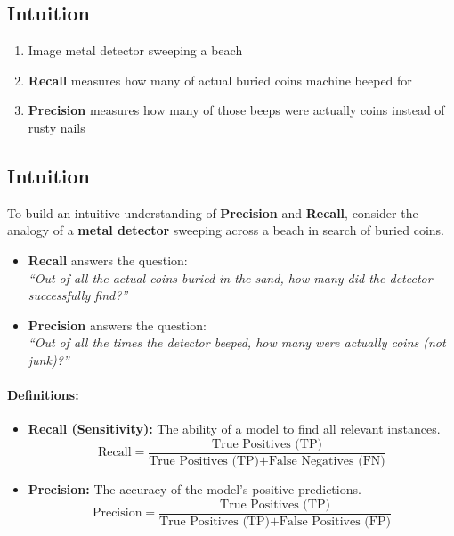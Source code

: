 \documentclass[12pt]{article}
\begin{document}
\subsection{Intuition}
\begin{enumerate}
    \item Image metal detector sweeping a beach
    \item \textbf{Recall} measures how many of actual buried coins machine beeped for
    \item \textbf{Precision} measures how many of those beeps were actually coins instead of rusty nails
\end{enumerate}

\subsection{Intuition}

To build an intuitive understanding of \textbf{Precision} and \textbf{Recall}, consider the analogy of a \textbf{metal detector} sweeping across a beach in search of buried coins.

\begin{itemize}
    \item \textbf{Recall} answers the question: \\
          \textit{``Out of all the actual coins buried in the sand, how many did the detector successfully find?''}
    \item \textbf{Precision} answers the question: \\
          \textit{``Out of all the times the detector beeped, how many were actually coins (not junk)?''}
\end{itemize}

\paragraph{Definitions:}

\begin{itemize}
    \item \textbf{Recall (Sensitivity):} The ability of a model to find all relevant instances.
          \[
              \text{Recall} = \frac{\text{True Positives (TP)}}{\text{True Positives (TP)} + \text{False Negatives (FN)}}
          \]
    \item \textbf{Precision:} The accuracy of the model's positive predictions.
          \[
              \text{Precision} = \frac{\text{True Positives (TP)}}{\text{True Positives (TP)} + \text{False Positives (FP)}}
          \]
\end{itemize}
\end{document}
